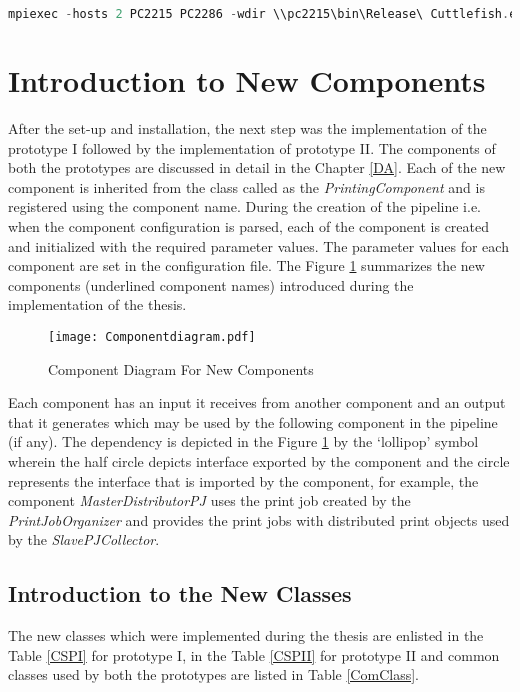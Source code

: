 \begin{lstlisting}[language=C++,label={lst:MPIC},caption={mpiexec syntax}]
mpiexec -hosts 2 PC2215 PC2286 -wdir \\pc2215\bin\Release\ Cuttlefish.exe \\pc2215\mainconf.json
\end{lstlisting}  
	
\section{Introduction to New Components}

After the set-up and installation, the next step was the implementation of the prototype I followed by the implementation of prototype II. The components of both the prototypes are discussed in detail in the Chapter \ref{DA}. Each of the new component is inherited from the class called as the \textit{PrintingComponent} and is registered using the component name. During the creation of the pipeline i.e. when the component configuration is parsed, each of the component is created and initialized with the required parameter values. The parameter values for each component are set in the configuration file. The Figure \ref{fig:Componentdiagram} summarizes the new components (underlined component names) introduced during the implementation of the thesis.

\begin{figure}[ht!]
\centering
\texttt{[image: Componentdiagram.pdf]}
\caption{Component Diagram For New Components}
\label{fig:Componentdiagram}
\end{figure}

Each component has an input it receives from another component and an output that it generates which may be used by the following component in the pipeline (if any). The dependency is depicted in the Figure \ref{fig:Componentdiagram} by the {\lq}lollipop{\rq} symbol wherein the half circle depicts interface exported by the component and the circle represents the interface that is imported by the component, for example, the component \textit{MasterDistributorPJ} uses the print job created by the \textit{PrintJobOrganizer} and provides the print jobs with distributed print objects used by the \textit{SlavePJCollector}.

\subsection{Introduction to the New Classes}
The new classes which were implemented during the thesis are enlisted in the Table \ref{CSPI} for prototype I, in the Table \ref{CSPII} for prototype II and common classes used by both the prototypes are listed in Table \ref{ComClass}. 

